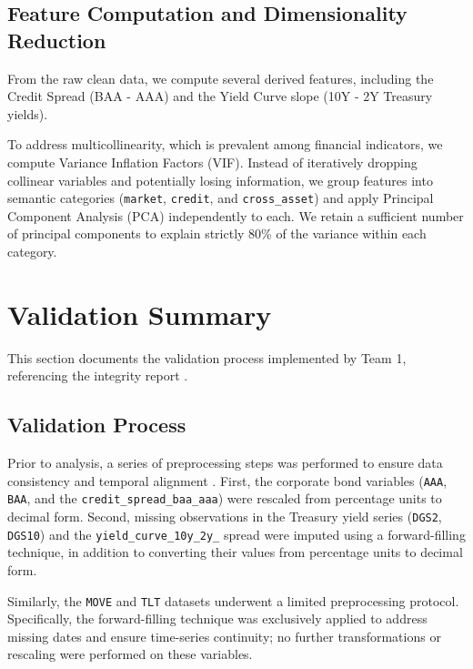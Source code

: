 \documentclass[a4paper,fleqn]{cas-dc} %
\begin{document}
\subsection{Feature Computation and Dimensionality Reduction}
From the raw clean data, we compute several derived features, including the Credit Spread (BAA - AAA) and the Yield Curve slope (10Y - 2Y Treasury yields).

To address multicollinearity, which is prevalent among financial indicators, we compute Variance Inflation Factors (VIF). Instead of iteratively dropping collinear variables and potentially losing information, we group features into semantic categories (\texttt{market}, \texttt{credit}, and \texttt{cross\_asset}) and apply Principal Component Analysis (PCA) independently to each. We retain a sufficient number of principal components to explain strictly 80\% of the variance within each category. 

\section{Validation Summary}

This section documents the validation process implemented by Team 1, referencing the integrity report \cite{team1_report}.

\subsection{Validation Process}
Prior to analysis, a series of preprocessing steps was performed to ensure data consistency and temporal alignment \cite{team1_script}. First, the corporate bond variables (\texttt{AAA}, \texttt{BAA}, and the \texttt{credit\_spread\_baa\_aaa}) were rescaled from percentage units to decimal form. Second, missing observations in the Treasury yield series (\texttt{DGS2}, \texttt{DGS10}) and the \texttt{yield\_curve\_10y\_2y\_} spread were imputed using a forward-filling technique, in addition to converting their values from percentage units to decimal form.

Similarly, the \texttt{MOVE} and \texttt{TLT} datasets underwent a limited preprocessing protocol. Specifically, the forward-filling technique was exclusively applied to address missing dates and ensure time-series continuity; no further transformations or rescaling were performed on these variables.
\end{document}
